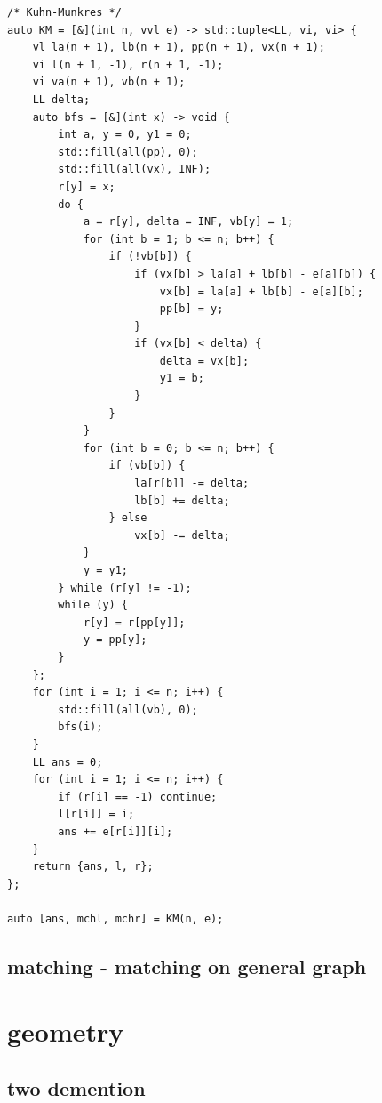 \documentclass[UTF8, a4paper, titlepage, twoside]{ctexart}
\begin{document}
\begin{lstlisting}[style=cpp]
/* Kuhn-Munkres */
auto KM = [&](int n, vvl e) -> std::tuple<LL, vi, vi> {
    vl la(n + 1), lb(n + 1), pp(n + 1), vx(n + 1);
    vi l(n + 1, -1), r(n + 1, -1);
    vi va(n + 1), vb(n + 1);
    LL delta;
    auto bfs = [&](int x) -> void {
        int a, y = 0, y1 = 0;
        std::fill(all(pp), 0);
        std::fill(all(vx), INF);
        r[y] = x;
        do {
            a = r[y], delta = INF, vb[y] = 1;
            for (int b = 1; b <= n; b++) {
                if (!vb[b]) {
                    if (vx[b] > la[a] + lb[b] - e[a][b]) {
                        vx[b] = la[a] + lb[b] - e[a][b];
                        pp[b] = y;
                    }
                    if (vx[b] < delta) {
                        delta = vx[b];
                        y1 = b;
                    }
                }
            }
            for (int b = 0; b <= n; b++) {
                if (vb[b]) {
                    la[r[b]] -= delta;
                    lb[b] += delta;
                } else
                    vx[b] -= delta;
            }
            y = y1;
        } while (r[y] != -1);
        while (y) {
            r[y] = r[pp[y]];
            y = pp[y];
        }
    };
    for (int i = 1; i <= n; i++) {
        std::fill(all(vb), 0);
        bfs(i);
    }
    LL ans = 0;
    for (int i = 1; i <= n; i++) {
        if (r[i] == -1) continue;
        l[r[i]] = i;
        ans += e[r[i]][i];
    }
    return {ans, l, r};
};

auto [ans, mchl, mchr] = KM(n, e);
\end{lstlisting}

\subsection{ matching - matching on general graph }

\newpage
\section{ geometry }
\subsection{ two demention }
\end{document}
